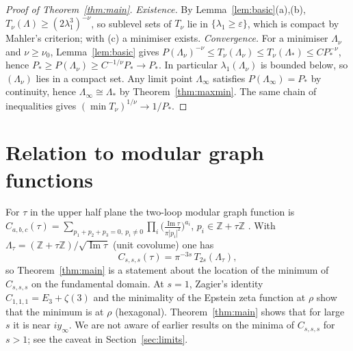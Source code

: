 \documentclass[11pt,a4paper]{amsart}
\theoremstyle{definition}
\newcommand{\Z}{\mathbb{Z}}
\newcommand{\Lat}{\Lambda}
\begin{document}
\begin{proof}[Proof of Theorem~\ref{thm:main}]
\emph{Existence.} By Lemma~\ref{lem:basic}(a),(b), $T_\nu(\Lat)\ge(2\lambda_1^3)^{-\nu}$, so sublevel sets of $T_\nu$ lie in $\{\lambda_1\ge\varepsilon\}$, which is compact by Mahler's criterion; with (c) a minimiser exists.
\emph{Convergence.} For a minimiser $\Lat_\nu$ and $\nu\ge\nu_0$, Lemma~\ref{lem:basic} gives
$P(\Lat_\nu)^{-\nu}\le T_\nu(\Lat_\nu)\le T_\nu(\Lat_*)\le CP_*^{-\nu}$, hence $P_*\ge P(\Lat_\nu)\ge C^{-1/\nu}P_*\to P_*$.
In particular $\lambda_1(\Lat_\nu)$ is bounded below, so $(\Lat_\nu)$ lies in a compact set. Any limit point $\Lat_\infty$ satisfies $P(\Lat_\infty)=P_*$ by continuity, hence $\Lat_\infty\cong\Lat_*$ by Theorem~\ref{thm:maxmin}. The same chain of inequalities gives $(\min T_\nu)^{1/\nu}\to1/P_*$.
\end{proof}

\section{Relation to modular graph functions}\label{sec:mgf}
For $\tau$ in the upper half plane the two-loop modular graph function is
$C_{a,b,c}(\tau)=\sum_{p_1+p_2+p_3=0,\ p_i\neq0}\prod_{i}\bigl(\tfrac{\operatorname{Im}\tau}{\pi|p_i|^2}\bigr)^{a_i}$, $p_i\in\Z+\tau\Z$ \cite{DGV}.
With $\Lat_\tau=(\Z+\tau\Z)/\sqrt{\operatorname{Im}\tau}$ (unit covolume) one has
\[
C_{s,s,s}(\tau)=\pi^{-3s}\,T_{2s}(\Lat_\tau),
\]
so Theorem~\ref{thm:main} is a statement about the location of the minimum of $C_{s,s,s}$ on the fundamental domain. At $s=1$, Zagier's identity $C_{1,1,1}=E_3+\zeta(3)$ and the minimality of the Epstein zeta function at $\rho$ \cite{Rankin,Cassels,Ennola,Diananda} show that the minimum is at $\rho$ (hexagonal). Theorem~\ref{thm:main} shows that for large $s$ it is near $i y_\infty$. We are not aware of earlier results on the minima of $C_{s,s,s}$ for $s>1$; see the caveat in Section~\ref{sec:limits}.
\end{document}
